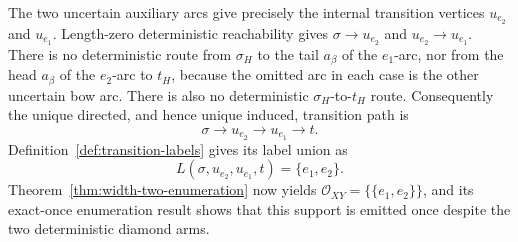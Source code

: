 The two uncertain auxiliary arcs give precisely the internal transition vertices \(u_{e_2}\) and \(u_{e_1}\).  Length-zero deterministic reachability gives \(\sigma\to u_{e_2}\) and \(u_{e_2}\to u_{e_1}\).  There is no deterministic route from \(\sigma_H\) to the tail \(a_\beta\) of the \(e_1\)-arc, nor from the head \(a_\beta\) of the \(e_2\)-arc to \(t_H\), because the omitted arc in each case is the other uncertain bow arc.  There is also no deterministic \(\sigma_H\)-to-\(t_H\) route.  Consequently the unique directed, and hence unique induced, transition path is
\[
 \sigma\to u_{e_2}\to u_{e_1}\to t.
\]
Definition~\ref{def:transition-labels} gives its label union as
\[
 L(\sigma,u_{e_2},u_{e_1},t)=\{e_1,e_2\}.
\]
Theorem~\ref{thm:width-two-enumeration} now yields
\(\mathcal O_{XY}=\{\{e_1,e_2\}\}\), and its exact-once enumeration result shows that this support is emitted once despite the two deterministic diamond arms.
